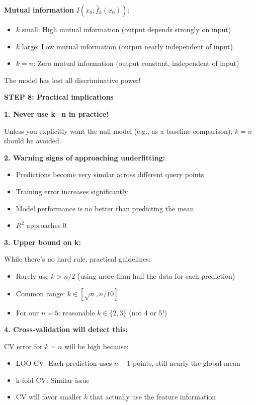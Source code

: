 \documentclass[12pt]{article}
\begin{document}
\begin{solution}
\textbf{Mutual information} \(I(x_0; \hat{f}_k(x_0))\):
\begin{itemize}
    \item \(k\) small: High mutual information (output depends strongly on input)
    \item \(k\) large: Low mutual information (output nearly independent of input)
    \item \(k = n\): Zero mutual information (output constant, independent of input)
\end{itemize}

The model has lost all discriminative power!

\textbf{STEP 8: Practical implications}

\textbf{1. Never use k=n in practice!}

Unless you explicitly want the null model (e.g., as a baseline comparison), \(k=n\) should be avoided.

\textbf{2. Warning signs of approaching underfitting:}

\begin{itemize}
    \item Predictions become very similar across different query points
    \item Training error increases significantly
    \item Model performance is no better than predicting the mean
    \item \(R^2\) approaches 0
\end{itemize}

\textbf{3. Upper bound on k:}

While there's no hard rule, practical guidelines:
\begin{itemize}
    \item Rarely use \(k > n/2\) (using more than half the data for each prediction)
    \item Common range: \(k \in [\sqrt{n}, n/10]\)
    \item For our \(n=5\): reasonable \(k \in \{2, 3\}\) (not 4 or 5!)
\end{itemize}

\textbf{4. Cross-validation will detect this:}

CV error for \(k=n\) will be high because:
\begin{itemize}
    \item LOO-CV: Each prediction uses \(n-1\) points, still nearly the global mean
    \item k-fold CV: Similar issue
    \item CV will favor smaller \(k\) that actually use the feature information
\end{itemize}


\end{solution}
\end{document}

